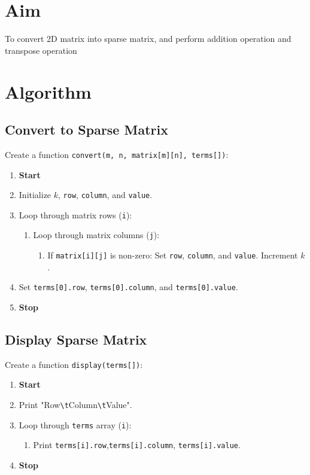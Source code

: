 
\section{Aim}
To convert 2D matrix into sparse matrix, and perform addition operation and transpose operation
\section{Algorithm}
 {\selectfont
  \subsection{Convert to Sparse Matrix}
  Create a function \texttt{convert(m, n, matrix[m][n], terms[])}:
  \begin{enumerate}
    \item \textbf{Start}
    \item Initialize $k$, \texttt{row}, \texttt{column}, and \texttt{value}.
    \item Loop through matrix rows (\texttt{i}):
          \begin{enumerate}[label=2.\arabic*.]
            \item Loop through matrix columns (\texttt{j}):
                  \begin{enumerate}[label=2.1.\arabic*.]
                    \item If \texttt{matrix[i][j]} is non-zero:
                          Set \texttt{row}, \texttt{column}, and \texttt{value}.
                          Increment $k$.
                  \end{enumerate}
          \end{enumerate}
    \item Set \texttt{terms[0].row}, \texttt{terms[0].column}, and \texttt{terms[0].value}.
    \item \textbf{Stop}
  \end{enumerate}

  \subsection{Display Sparse Matrix}
  Create a function \texttt{display(terms[])}:
  \begin{enumerate}
    \item \textbf{Start}
    \item Print "Row\texttt{\textbackslash t}Column\texttt{\textbackslash t}Value".
    \item Loop through \texttt{terms} array (\texttt{i}):
          \begin{enumerate}[label=3.\arabic*.]
            \item Print \texttt{terms[i].row},\texttt{terms[i].column}, \texttt{terms[i].value}.
          \end{enumerate}
    \item \textbf{Stop}
  \end{enumerate}

}
